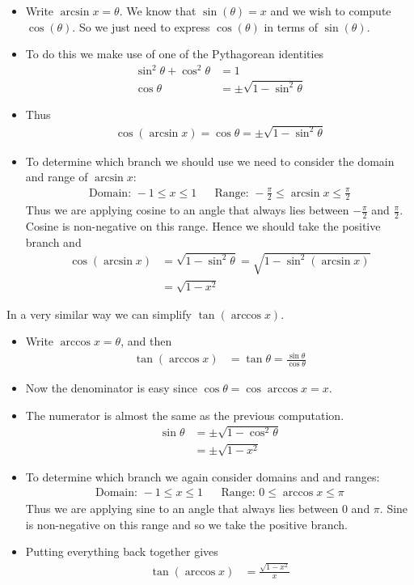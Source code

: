 \begin{itemize}
\item Write $\arcsin x=\theta$. We know that $\sin(\theta)=x$ and we wish to
compute $\cos(\theta)$. So we just need to express $\cos(\theta)$ in terms of
$\sin(\theta)$.

 \item To do this we make use of one of the Pythagorean identities
  \begin{align*}
  \sin^2\theta + \cos^2\theta &=1\\
  \cos\theta &= \pm \sqrt{1-\sin^2\theta}
\end{align*}
\item Thus
\begin{align*}
  \cos(\arcsin x) = \cos\theta = \pm\sqrt{1-\sin^2\theta}
\end{align*}

 \item To determine which branch we should use we need to consider the domain
and range of $\arcsin x$:
\begin{align*}
  \text{Domain: } -1 \leq x \leq 1 && \text{Range: } -\frac{\pi}{2} \leq \arcsin x \leq \frac{\pi}{2}
\end{align*}
  Thus we are applying cosine to an angle that always lies between $-\frac{\pi}{2}$ and $\frac{\pi}{2}$. Cosine is non-negative on this range. Hence we should take the positive branch and
\begin{align*}
  \cos(\arcsin x) &= \sqrt{1-\sin^2\theta}= \sqrt{1-\sin^2(\arcsin x)} \\
  &= \sqrt{1-x^2}
\end{align*}
\end{itemize}
In a very similar way we can simplify $\tan(\arccos x)$.
\begin{itemize}
\item Write $\arccos x=\theta$, and then
\begin{align*}
  \tan( \arccos x) &= \tan \theta = \frac{\sin\theta}{\cos \theta}
\end{align*}
\item Now the denominator is easy since $\cos \theta = \cos \arccos x = x$.
\item The numerator is almost the same as the previous computation.
\begin{align*}
  \sin\theta &= \pm \sqrt{1-\cos^2\theta} \\
  &= \pm \sqrt{1-x^2}
\end{align*}
 \item To determine which branch we again consider domains and
and ranges:
\begin{align*}
  \text{Domain: } -1 \leq x \leq 1 && \text{Range: } 0 \leq \arccos
x \leq \pi
\end{align*}
  Thus we are applying sine to an angle that always lies between
$0$ and $\pi$. Sine is non-negative on this range and so we take the positive
branch.
\item Putting everything back together gives
\begin{align*}
  \tan(\arccos x) &= \frac{\sqrt{1-x^2}}{x}
\end{align*}

\end{itemize}


